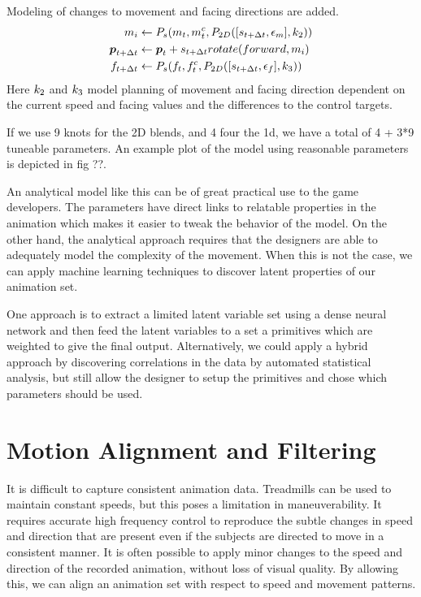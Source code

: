 Modeling of changes to movement and facing directions are added.
\begin{subequations}
\begin{align}
    m_i&\leftarrow P_s(m_t,m^c_t,P_{2D}([s_{t+\Delta{t}},\epsilon_m], k_2))\\ 
    \boldsymbol{p }_{t+\Delta{t}}&\leftarrow{}\boldsymbol{p }_t+s_{t+\Delta{t}}{}rotate(forward,m_i)\\
    f_{t+\Delta{t}}&\leftarrow P_s(f_t,f^c_t,P_{2D}([s_{t+\Delta{t}},\epsilon_f], k_3))
\end{align}
\end{subequations}
Here $k_2$ and $k_3$ model planning of movement and facing direction dependent on the current speed and facing values and the differences to the control targets.

If we use 9 knots for the 2D blends, and 4 four the 1d, we have a total of 4 + 3*9 tuneable parameters. An example plot of the model using reasonable parameters is depicted in fig ??.

An analytical model like this can be of great practical use to the game developers. The parameters have direct links to relatable properties in the animation which makes it easier to tweak the behavior of the model. On the other hand, the analytical approach requires that the designers are able to adequately model the complexity of the movement. When this is not the case, we can apply machine learning techniques to discover latent properties of our animation set. 

One approach is to extract a limited latent variable set using a dense neural network and then feed the latent variables to a set a primitives which are weighted to give the final output. 
Alternatively, we could apply a hybrid approach by discovering correlations in the data by automated statistical analysis, but still allow the designer to setup the primitives and chose which parameters should be used. 

\section{Motion Alignment and Filtering}
It is difficult to capture consistent animation data. Treadmills can be used to maintain constant speeds, but this poses a limitation in maneuverability. It requires accurate high frequency control to reproduce the subtle changes in speed and direction that are present even if the subjects are directed to move in a consistent manner. It is often possible to apply minor changes to the speed and direction of the recorded animation, without loss of visual quality. By allowing this, we can align an animation set with respect to speed and movement patterns. 

